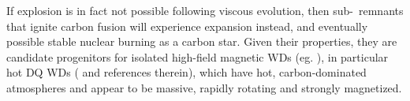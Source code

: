 If explosion is in fact not possible following viscous evolution, then sub-\Mch\ remnants that ignite carbon fusion will experience expansion instead, and eventually possible stable nuclear burning as a carbon star.  Given their properties, they are candidate progenitors for isolated high-field magnetic WDs (eg. \citealt{garc+12}), in particular hot DQ WDs (\citealt{dunlc15,dunl15thesis} and references therein), which have hot, carbon-dominated atmospheres and appear to be massive, rapidly rotating and strongly magnetized.





